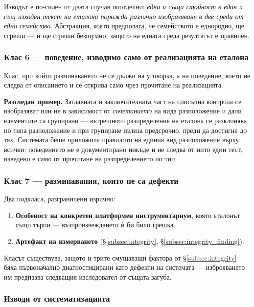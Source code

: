 Изводът е по-силен от двата случая поотделно: \emph{една и съща стойност в един и същ изходен текст
на еталона поражда различно изобразяване в две среди от едно семейство}. Абстракция, която
предполага, че семейството е еднородно, ще сгреши --- и ще сгреши безшумно, защото на едната среда
резултатът е правилен.

\subsubsection{Клас 6 --- поведение, изводимо само от реализацията на еталона}

Клас, при който разминаването не се дължи на уговорка, а на поведение, което не следва от описанието
и се открива само чрез прочитане на реализацията.

\textbf{Разгледан пример.} Заглавната и заключителната част на списъчна контрола се изобразяват или
не в зависимост от \emph{съчетанието} на вида разположение и дали елементите са групирани ---
вътрешното разпределение на еталона се разклонява по типа разположение и при групиране излиза
предсрочно, преди да достигне до тях. Системата беше приложила правилото на единия вид разположение
върху всички; поведението не е документирано никъде и не следва от нито един тест, изведено е само
от прочитане на разпределението по тип.

\subsubsection{Клас 7 --- разминавания, които не са дефекти}

Два подкласа, разграничени изрично:

\begin{enumerate}[topsep=2pt,itemsep=1pt,leftmargin=*]
\item \textbf{Особеност на конкретен платформен инструментариум}, която еталонът също търпи ---
      възпроизвеждането ѝ би било грешка.
\item \textbf{Артефакт на измерването} (§\ref{subsec:integrity}, §\ref{subsec:integrity_finding}).
\end{enumerate}

Класът съществува, защото и трите смущаващи фактора от §\ref{subsec:integrity} бяха първоначално
диагностицирани като дефекти на системата --- изброяването им предпазва следващия изследовател от
същата загуба.

\subsubsection{Изводи от систематизацията}


